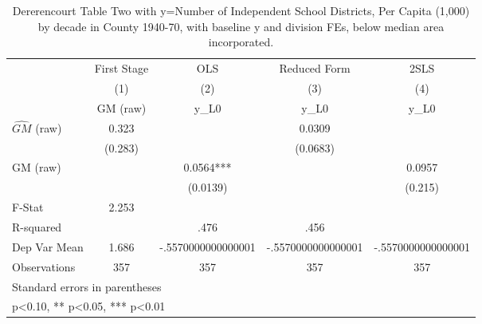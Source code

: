 \begin{table}[htbp]\centering
\def\sym#1{\ifmmode^{#1}\else\(^{#1}\)\fi}
\caption{Dererencourt Table Two with y=Number of Independent School Districts, Per Capita (1,000) by decade in County 1940-70, with baseline y and division FEs, below median area incorporated.}
\begin{tabular}{l*{4}{c}}
\toprule
                    & First Stage   &         OLS   &Reduced Form   &        2SLS   \\
                    &\multicolumn{1}{c}{(1)}&\multicolumn{1}{c}{(2)}&\multicolumn{1}{c}{(3)}&\multicolumn{1}{c}{(4)}\\
                    &\multicolumn{1}{c}{GM  (raw)}&\multicolumn{1}{c}{y\_L0}&\multicolumn{1}{c}{y\_L0}&\multicolumn{1}{c}{y\_L0}\\
\midrule
$\hat{GM}$ (raw)    &       0.323   &               &      0.0309   &               \\
                    &     (0.283)   &               &    (0.0683)   &               \\
\addlinespace
GM  (raw)           &               &      0.0564***&               &      0.0957   \\
                    &               &    (0.0139)   &               &     (0.215)   \\
\midrule
F-Stat              &       2.253   &               &               &               \\
R-squared           &               &        .476   &        .456   &               \\
Dep Var Mean        &       1.686   &-.5570000000000001   &-.5570000000000001   &-.5570000000000001   \\
Observations        &         357   &         357   &         357   &         357   \\
\bottomrule
\multicolumn{5}{l}{\footnotesize Standard errors in parentheses}\\
\multicolumn{5}{l}{\footnotesize * p<0.10, ** p<0.05, *** p<0.01}\\
\end{tabular}
\end{table}
